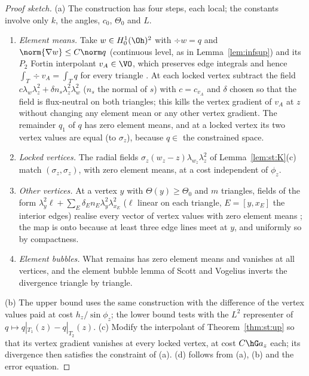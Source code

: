 \begin{proof}[Proof sketch]
(a) The construction has four steps, each local; the constants involve only $k$, the angles, $c_0$, $\Theta_0$ and $L$.
\begin{enumerate}[label=\Alph*.]
\item \emph{Element means.} Take $w\in H^1_0(\Oh)^2$ with $\div w=q$ and $\norm{\nabla w}\le C\norm q$ (continuous level, as in Lemma~\ref{lem:infsup}) and its $P_2$ Fortin interpolant $v_A\in\VO$, which preserves edge integrals and hence $\int_T\div v_A=\int_Tq$ for every triangle \cite{GiraultRaviart}. At each locked vertex subtract the field $c\lambda_w\lambda_z^2+\delta n_s\lambda_z^2\lambda_w^2$ ($n_s$ the normal of $s$) with $c=c_{v_A}$ and $\delta$ chosen so that the field is flux-neutral on both triangles; this kills the vertex gradient of $v_A$ at $z$ without changing any element mean or any other vertex gradient. The remainder $q_1$ of $q$ has zero element means, and at a locked vertex its two vertex values are equal (to $\sigma_z$), because $q\in$ the constrained space.
\item \emph{Locked vertices.} The radial fields $\sigma_z(w_z-z)\lambda_{w_z}\lambda_z^2$ of Lemma~\ref{lem:st:K}(c) match $(\sigma_z,\sigma_z)$, with zero element means, at a cost independent of $\phi_z$.
\item \emph{Other vertices.} At a vertex $y$ with $\Theta(y)\ge\Theta_0$ and $m$ triangles, fields of the form $\lambda_y^2\ell+\sum_E\delta_En_E\lambda_y^2\lambda_{x_E}^2$ ($\ell$ linear on each triangle, $E=[y,x_E]$ the interior edges) realise every vector of vertex values with zero element means \cite{GuzmanScott2019,PadhiExt}; the map is onto because at least three edge lines meet at $y$, and uniformly so by compactness.
\item \emph{Element bubbles.} What remains has zero element means and vanishes at all vertices, and the element bubble lemma of Scott and Vogelius \cite{ScottVogelius1985} inverts the divergence triangle by triangle.
\end{enumerate} (b) The upper bound uses the same construction with the difference of the vertex values paid at cost $h_z/\sin\phi_z$; the lower bound tests with the $L^2$ representer of $q\mapsto q|_{T_1}(z)-q|_{T_2}(z)$. (c) Modify the interpolant of Theorem~\ref{thm:st:up} so that its vertex gradient vanishes at every locked vertex, at cost $C\hG a_z$ each; its divergence then satisfies the constraint of (a). (d) follows from (a), (b) and the error equation.
\end{proof}

